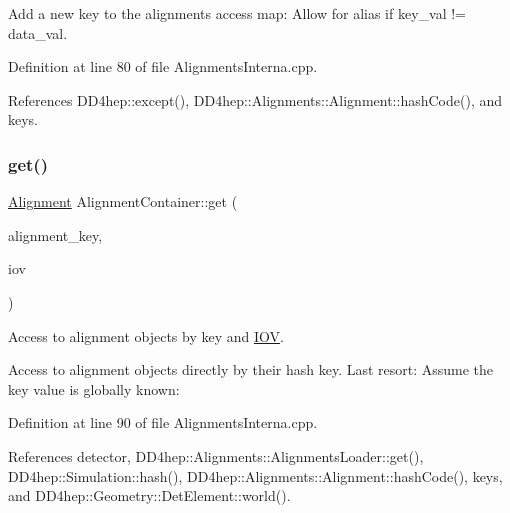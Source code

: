 Add a new key to the alignments access map\+: Allow for alias if key\+\_\+val != data\+\_\+val. 



Definition at line 80 of file Alignments\+Interna.\+cpp.



References D\+D4hep\+::except(), D\+D4hep\+::\+Alignments\+::\+Alignment\+::hash\+Code(), and keys.

\hypertarget{class_d_d4hep_1_1_alignments_1_1_interna_1_1_alignment_container_a94c052115a69265deef948ded2c96e8a}{}\label{class_d_d4hep_1_1_alignments_1_1_interna_1_1_alignment_container_a94c052115a69265deef948ded2c96e8a} 
\subsubsection{\texorpdfstring{get()}{get()}\hspace{0.1cm}{\footnotesize\ttfamily [1/4]}}
{\footnotesize\ttfamily \hyperlink{class_d_d4hep_1_1_alignments_1_1_alignment}{Alignment} Alignment\+Container\+::get (\begin{DoxyParamCaption}\item[{const std\+::string \&}]{alignment\+\_\+key,  }\item[{const \hyperlink{class_d_d4hep_1_1_alignments_1_1_interna_1_1_alignment_container_a99b2a8d269ecefcf1b59269ad94e75e3}{iov\+\_\+type} \&}]{iov }\end{DoxyParamCaption})}



Access to alignment objects by key and \hyperlink{class_d_d4hep_1_1_i_o_v}{I\+OV}. 

Access to alignment objects directly by their hash key. Last resort\+: Assume the key value is globally known\+: 

Definition at line 90 of file Alignments\+Interna.\+cpp.



References detector, D\+D4hep\+::\+Alignments\+::\+Alignments\+Loader\+::get(), D\+D4hep\+::\+Simulation\+::hash(), D\+D4hep\+::\+Alignments\+::\+Alignment\+::hash\+Code(), keys, and D\+D4hep\+::\+Geometry\+::\+Det\+Element\+::world().



